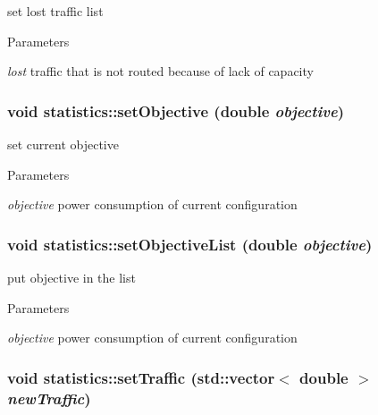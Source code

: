 set lost traffic list 


\begin{DoxyParams}{Parameters}
\item[{\em lost}]traffic that is not routed because of lack of capacity \end{DoxyParams}
\hypertarget{classstatistics_ab2fd434123379e7814c21bc38ff2bb20}{
\subsubsection[{setObjective}]{\setlength{\rightskip}{0pt plus 5cm}void statistics::setObjective (double {\em objective})}}
\label{classstatistics_ab2fd434123379e7814c21bc38ff2bb20}


set current objective 


\begin{DoxyParams}{Parameters}
\item[{\em objective}]power consumption of current configuration \end{DoxyParams}
\hypertarget{classstatistics_a625258dee0b4eaf0fa5ade3643a4535e}{
\subsubsection[{setObjectiveList}]{\setlength{\rightskip}{0pt plus 5cm}void statistics::setObjectiveList (double {\em objective})}}
\label{classstatistics_a625258dee0b4eaf0fa5ade3643a4535e}


put objective in the list 


\begin{DoxyParams}{Parameters}
\item[{\em objective}]power consumption of current configuration \end{DoxyParams}
\hypertarget{classstatistics_a3eca72da112aae2a944b7dc40a59b787}{
\subsubsection[{setTraffic}]{\setlength{\rightskip}{0pt plus 5cm}void statistics::setTraffic (std::vector$<$ double $>$ {\em newTraffic})}}
\label{classstatistics_a3eca72da112aae2a944b7dc40a59b787}


